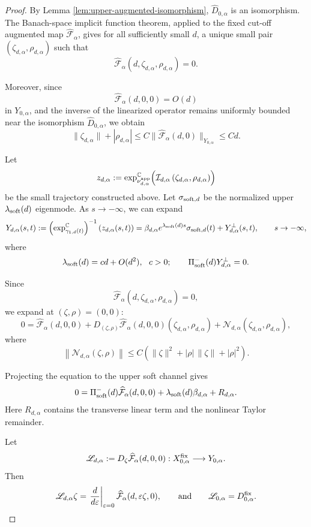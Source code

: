 \documentclass[11pt]{amsart}
\theoremstyle{plain}
\theoremstyle{definition}
\newcommand{\C}{\mathbb{C}}
\begin{document}
\begin{proof}
By Lemma \ref{lem:upper-augmented-isomorphism}, $\widehat{D}_{0,\alpha}$ is an
isomorphism. The Banach-space implicit function theorem, applied to the fixed cut-off augmented map $\widehat{\mathcal{F}}_{\alpha}$, gives for all sufficiently small $d$, a unique small pair
$(\zeta_{d,\alpha},\rho_{d,\alpha})$ such that
\[
\widehat{\mathcal F}_\alpha
(d,\zeta_{d,\alpha},\rho_{d,\alpha})=0.
\]

Moreover, since
\[
\widehat{\mathcal F}_\alpha(d,0,0)=O(d)
\]
in $Y_{0,\alpha}$, and the inverse of the linearized operator remains
uniformly bounded near the isomorphism $\widehat D_{0,\alpha}$, we obtain
\begin{equation}\label{eq:zeta-rho}
\|\zeta_{d,\alpha}\|+|\rho_{d,\alpha}|\le C\|\widehat{\mathcal F}_\alpha(d,0)\|_{Y_{0,\alpha}}
\le Cd.
\end{equation}

Let
\[
z_{d,\alpha}:=\exp_{\nu^{\rm app}_{d,\alpha}}^{\C}
\Bigl(\mathcal I_{d,\alpha}\left(\zeta_{d,\alpha},\rho_{d,\alpha}
\right)\Bigr)
\]
be the small trajectory constructed above. Let
$\sigma_{{\rm soft},d}$ be the normalized upper $\lambda_{\rm soft}(d)$ eigenmode.
As $s\to-\infty$, we can expand
\[
Y_{d,\alpha}(s,t):=\left(\exp_{\gamma_{1,d}(t)}^{\C}\right)^{-1}(z_{d,\alpha}(s,t))=\beta_{d,\alpha}
e^{\lambda_{\rm soft}(d)s}
\sigma_{{\rm soft},d}(t)
+Y_{d,\alpha}^{\perp}(s,t),\qquad s\to-\infty,
\]
where
\[
\lambda_{\rm soft}(d)=c d+O(d^2),~~c>0;
\qquad
\Pi_{\rm soft}^-(d)Y_{d,\alpha}^{\perp}=0.
\]


Since
\[
\widehat{\mathcal F}_{\alpha}
\left(d,\zeta_{d,\alpha},\rho_{d,\alpha}\right)=0,
\]
we expand at $(\zeta,\rho)=(0,0)$:
\[
0=\widehat{\mathcal F}_{\alpha}(d,0,0)+D_{(\zeta,\rho)}
\widehat{\mathcal F}_{\alpha}(d,0,0)
\left(\zeta_{d,\alpha},\rho_{d,\alpha}
\right)+\mathcal N_{d,\alpha}
\left(\zeta_{d,\alpha},\rho_{d,\alpha}\right),
\]
where
\[
\left\|\mathcal N_{d,\alpha}(\zeta,\rho)\right\|
\le C\left(\|\zeta\|^2+|\rho|\,\|\zeta\|+|\rho|^2
\right).
\]

Projecting the equation to the upper soft channel gives
\[
0=\Pi_{\rm soft}^-(d)\widehat{\mathcal F}_{\alpha}(d,0,0)+\lambda_{\rm soft}(d)\beta_{d,\alpha}+
R_{d,\alpha}.
\]
Here $R_{d,\alpha}$ contains the transverse linear term and the nonlinear Taylor remainder.  


Let
\[
\mathscr L_{d,\alpha}
:=D_\zeta\widehat{\mathcal F}_\alpha(d,0,0)
:X^{\rm fix}_{0,\alpha}\longrightarrow Y_{0,\alpha}.
\]
Then
\[
\mathscr L_{d,\alpha}\zeta
=\left.\frac{d}{d\varepsilon}\right|_{\varepsilon=0}
\widehat{\mathcal F}_\alpha(d,\varepsilon\zeta,0),\qquad\text{and}\qquad \mathscr L_{0,\alpha}=D_{0,\alpha}^{\rm fix}.
\]


\end{proof}
\end{document}
